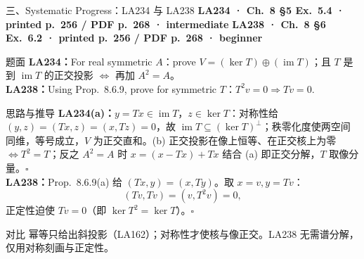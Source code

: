 \documentclass[aspectratio=169,10pt,fontset=none]{ctexbeamer}
\newcommand{\ex}[1]{\textcolor{accent}{\footnotesize\bfseries #1}}
\begin{document}
\begin{frame}[t]{三、Systematic Progress：LA234 与 LA238}
  \leavevmode\ex{LA234 · Ch.~8 §5 Ex.~5.4 · printed p.~256 / PDF p.~268 · intermediate}\quad
  \ex{LA238 · Ch.~8 §6 Ex.~6.2 · printed p.~256 / PDF p.~268 · beginner}
  \begin{block}{\footnotesize 题面}
    \scriptsize \textbf{LA234：}For real symmetric $A$：prove $V=(\ker T)\oplus(\operatorname{im}T)$；且 $T$ 是到 $\operatorname{im}T$ 的正交投影 $\iff$ 再加 $A^2=A$。\\
    \textbf{LA238：}Using Prop.~8.6.9, prove for symmetric $T$：$T^2v=0\Rightarrow Tv=0$.
  \end{block}
  \begin{exampleblock}{\footnotesize 思路与推导}
    \scriptsize
    \textbf{LA234(a)：}$y=Tx\in\operatorname{im}T$，$z\in\ker T$：对称性给 $(y,z)=(Tx,z)=(x,Tz)=0$，故 $\operatorname{im}T\subseteq(\ker T)^\perp$；秩零化度使两空间同维，等号成立，$V$ 为正交直和。(b) 正交投影在像上恒等、在正交核上为零 $\iff T^2=T$；反之 $A^2=A$ 时 $x=(x-Tx)+Tx$ 结合 (a) 即正交分解，$T$ 取像分量。$\square$\\[2pt]
    \textbf{LA238：}Prop.~8.6.9(a) 给 $(Tx,y)=(x,Ty)$。取 $x=v,y=Tv$：
    $$(Tv,Tv)=(v,T^2v)=0,$$
    正定性迫使 $Tv=0$（即 $\ker T^2=\ker T$）。$\square$
  \end{exampleblock}
  \begin{block}{\footnotesize 对比}
    \scriptsize 幂等只给出斜投影（LA162）；对称性才使核与像正交。LA238 无需谱分解，仅用对称刻画与正定性。
  \end{block}
\end{frame}
\end{document}
